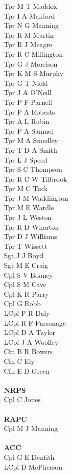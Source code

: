 \begin{multicols}{3}
  Tpr M T Maddox \\
  Tpr I A Manford \\
  Tpr N G Manning \\
  Tpr R M Martin \\
  Tpr R J Meagre \\
  Tpr R C Millington \\
  Tpr G J Morrison \\
  Tpr K M S Murphy \\
  Tpr G T Nield \\
  Tpr J A O'Neill \\
  Tpr P F Parnell \\
  Tpr P A Roberts \\
  Tpr A L Rubin \\
  Tpr P A Samuel \\
  Tpr M A Smedley \\
  Tpr T D A Smith \\
  Tpr L J Speed \\
  Tpr S C Thompson \\
  Tpr R C W Tilbrook \\
  Tpr M C Tuck \\
  Tpr J M Waddington \\
  Tpr M E Wardle \\
  Tpr J L Weston \\
  Tpr R D Wharton \\
  Tpr D J Williams \\
  Tpr T Wissett \\
  Sgt J J Boyd \\
  Sgt M E Craig \\
  Cpl S V Bonney \\
  Cpl S M Cave \\
  Cpl K R Parry \\
  Cpl G Robb \\
  LCpl P R Daly \\
  LCpl R F Parsonage \\
  LCpl D A Taylor \\
  LCpl J A Woolley \\
  Cfn B R Bowers \\
  Cfn C Ely \\
  Cfn E D Green \\
  \\
  \textbf{NRPS} \\
  Cpl C Jones \\
  \\
  \textbf{RAPC} \\
  Cpl M J Manning \\
  \\
  \textbf{ACC} \\
  Cpl G E Dentith \\
  LCpl D McPherson \\
\end{multicols}

